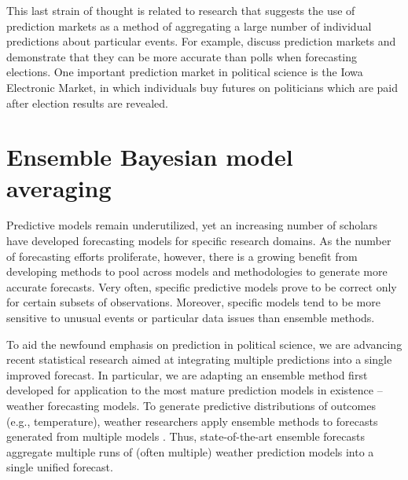 This last strain of thought is related to research that suggests the
use of prediction markets as a method of aggregating a large number of
individual predictions about particular events. For example,
\citet{berg:2008} discuss prediction markets and demonstrate that they
can be more accurate than polls when forecasting elections. One
important prediction market in political science is the Iowa
Electronic Market, in which individuals buy futures on politicians
which are paid after election results are revealed.


\section{Ensemble Bayesian model averaging} 

Predictive models remain underutilized, yet an increasing number of
scholars have developed forecasting models for specific research
domains.  As the number of forecasting efforts proliferate, however,
there is a growing benefit from developing methods to pool across
models and methodologies to generate more accurate forecasts.  Very
often, specific predictive models prove to be correct only for certain
subsets of observations.  Moreover, specific models tend to be more
sensitive to unusual events or particular data issues than ensemble
methods.

To aid the newfound emphasis on prediction in political science, we
are advancing recent statistical research aimed at integrating
multiple predictions into a single improved forecast.  In particular,
we are adapting an ensemble method first developed for application to
the most mature prediction models in existence -- weather forecasting
models.  To generate predictive distributions of outcomes (e.g.,
temperature), weather researchers apply ensemble methods to forecasts
generated from multiple models \citep{Raftery:2005}.  Thus,
state-of-the-art ensemble forecasts aggregate multiple runs of (often
multiple) weather prediction models into a single unified forecast.

